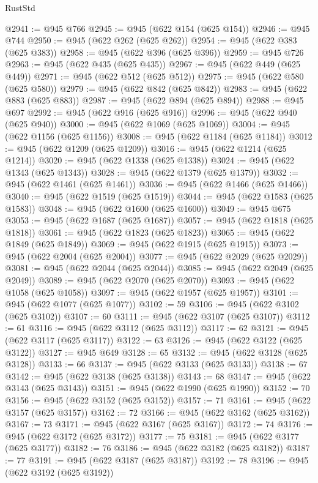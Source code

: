 \begin{lexlean}{RustStd}
\begin{coremodule}
@2941 := @945 @766
@2945 := @945 (@622 @154 (@625 @154))
@2946 := @945 @744
@2950 := @945 (@622 @262 (@625 @262))
@2954 := @945 (@622 @383 (@625 @383))
@2958 := @945 (@622 @396 (@625 @396))
@2959 := @945 @726
@2963 := @945 (@622 @435 (@625 @435))
@2967 := @945 (@622 @449 (@625 @449))
@2971 := @945 (@622 @512 (@625 @512))
@2975 := @945 (@622 @580 (@625 @580))
@2979 := @945 (@622 @842 (@625 @842))
@2983 := @945 (@622 @883 (@625 @883))
@2987 := @945 (@622 @894 (@625 @894))
@2988 := @945 @697
@2992 := @945 (@622 @916 (@625 @916))
@2996 := @945 (@622 @940 (@625 @940))
@3000 := @945 (@622 @1069 (@625 @1069))
@3004 := @945 (@622 @1156 (@625 @1156))
@3008 := @945 (@622 @1184 (@625 @1184))
@3012 := @945 (@622 @1209 (@625 @1209))
@3016 := @945 (@622 @1214 (@625 @1214))
@3020 := @945 (@622 @1338 (@625 @1338))
@3024 := @945 (@622 @1343 (@625 @1343))
@3028 := @945 (@622 @1379 (@625 @1379))
@3032 := @945 (@622 @1461 (@625 @1461))
@3036 := @945 (@622 @1466 (@625 @1466))
@3040 := @945 (@622 @1519 (@625 @1519))
@3044 := @945 (@622 @1583 (@625 @1583))
@3048 := @945 (@622 @1600 (@625 @1600))
@3049 := @945 @675
@3053 := @945 (@622 @1687 (@625 @1687))
@3057 := @945 (@622 @1818 (@625 @1818))
@3061 := @945 (@622 @1823 (@625 @1823))
@3065 := @945 (@622 @1849 (@625 @1849))
@3069 := @945 (@622 @1915 (@625 @1915))
@3073 := @945 (@622 @2004 (@625 @2004))
@3077 := @945 (@622 @2029 (@625 @2029))
@3081 := @945 (@622 @2044 (@625 @2044))
@3085 := @945 (@622 @2049 (@625 @2049))
@3089 := @945 (@622 @2070 (@625 @2070))
@3093 := @945 (@622 @1058 (@625 @1058))
@3097 := @945 (@622 @1957 (@625 @1957))
@3101 := @945 (@622 @1077 (@625 @1077))
@3102 := 59
@3106 := @945 (@622 @3102 (@625 @3102))
@3107 := 60
@3111 := @945 (@622 @3107 (@625 @3107))
@3112 := 61
@3116 := @945 (@622 @3112 (@625 @3112))
@3117 := 62
@3121 := @945 (@622 @3117 (@625 @3117))
@3122 := 63
@3126 := @945 (@622 @3122 (@625 @3122))
@3127 := @945 @649
@3128 := 65
@3132 := @945 (@622 @3128 (@625 @3128))
@3133 := 66
@3137 := @945 (@622 @3133 (@625 @3133))
@3138 := 67
@3142 := @945 (@622 @3138 (@625 @3138))
@3143 := 68
@3147 := @945 (@622 @3143 (@625 @3143))
@3151 := @945 (@622 @1990 (@625 @1990))
@3152 := 70
@3156 := @945 (@622 @3152 (@625 @3152))
@3157 := 71
@3161 := @945 (@622 @3157 (@625 @3157))
@3162 := 72
@3166 := @945 (@622 @3162 (@625 @3162))
@3167 := 73
@3171 := @945 (@622 @3167 (@625 @3167))
@3172 := 74
@3176 := @945 (@622 @3172 (@625 @3172))
@3177 := 75
@3181 := @945 (@622 @3177 (@625 @3177))
@3182 := 76
@3186 := @945 (@622 @3182 (@625 @3182))
@3187 := 77
@3191 := @945 (@622 @3187 (@625 @3187))
@3192 := 78
@3196 := @945 (@622 @3192 (@625 @3192))

\end{coremodule}
\end{lexlean}
